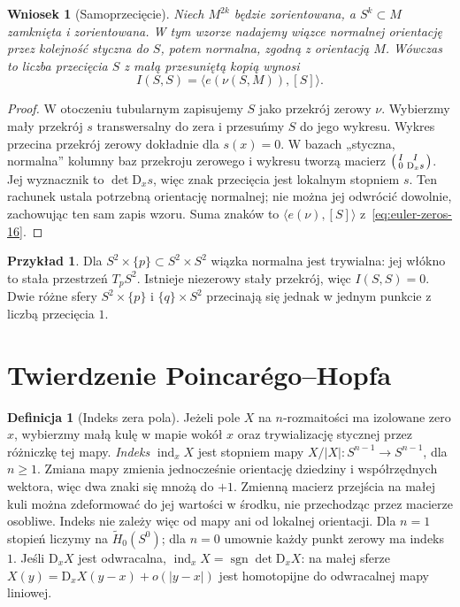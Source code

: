 \documentclass[11pt,a4paper,oneside]{report}
\newcommand{\D}{\mathrm D}
\theoremstyle{plain}
\newtheorem{wniosek}[twierdzenie]{Wniosek}
\theoremstyle{definition}
\newtheorem{definicja}[twierdzenie]{Definicja}
\newtheorem{przyklad}[twierdzenie]{Przykład}
\theoremstyle{remark}
\begin{document}
\begin{wniosek}[Samoprzecięcie]
\label{cor:samoprzeciecie-16}
Niech $M^{2k}$ będzie zorientowana, a
$S^k\subset M$ zamknięta i zorientowana.
W tym wzorze nadajemy wiązce normalnej orientację
przez kolejność \emph{styczna do $S$, potem normalna},
zgodną z orientacją $M$. Wówczas
to liczba przecięcia
$S$ z małą przesuniętą
kopią wynosi
\[
 I(S,S)=\langle e(\nu(S,M)),[S]\rangle.
\]
\end{wniosek}
\begin{proof}
W otoczeniu tubularnym
zapisujemy $S$ jako
przekrój zerowy $\nu$.
Wybierzmy mały przekrój
$s$ transwersalny do
zera i przesuńmy $S$
do jego wykresu.
Wykres przecina
przekrój zerowy
dokładnie dla $s(x)=0$.
W bazach „styczna, normalna” kolumny baz
przekroju zerowego i wykresu tworzą macierz
$\begin{psmallmatrix}I&I\\0&\D_xs\end{psmallmatrix}$.
Jej wyznacznik to $\det\D_xs$, więc znak przecięcia
jest lokalnym stopniem $s$. Ten rachunek ustala
potrzebną orientację normalnej; nie można jej
odwrócić dowolnie, zachowując ten sam zapis wzoru.
Suma znaków to
$\langle e(\nu),[S]\rangle$
z~\eqref{eq:euler-zeros-16}.
\end{proof}

\begin{przyklad}
Dla $S^2\times\{p\}
\subset S^2\times S^2$
wiązka normalna jest
trywialna: jej włókno
to stała przestrzeń
$T_pS^2$. Istnieje
niezerowy stały
przekrój, więc
$I(S,S)=0$.
Dwie różne sfery
$S^2\times\{p\}$
i $\{q\}\times S^2$
przecinają się
jednak w jednym
punkcie z liczbą
przecięcia $1$.
\end{przyklad}

\section{Twierdzenie Poincarégo--Hopfa}
\label{sec:poincare-hopf-16}

\begin{definicja}[Indeks zera pola]
Jeżeli pole $X$ na
$n$-rozmaitości ma
izolowane zero $x$,
wybierzmy małą kulę w mapie wokół $x$
oraz trywializację stycznej przez różniczkę tej mapy.
\emph{Indeks} $\operatorname{ind}_x X$
jest stopniem mapy
$X/|X|:S^{n-1}\to S^{n-1}$, dla $n\geq1$.
Zmiana mapy zmienia jednocześnie orientację dziedziny
i współrzędnych wektora, więc dwa znaki się mnożą
do $+1$. Zmienną macierz przejścia na małej kuli
można zdeformować do jej wartości w środku, nie
przechodząc przez macierze osobliwe. Indeks nie
zależy więc od mapy ani od lokalnej orientacji.
Dla $n=1$ stopień liczymy na $\widetilde H_0(S^0)$;
dla $n=0$ umownie każdy punkt zerowy ma indeks $1$.
Jeśli $\D_xX$ jest
odwracalna,
$\operatorname{ind}_xX
=\operatorname{sgn}\det\D_xX$:
na małej sferze
$X(y)=\D_xX(y-x)+o(|y-x|)$
jest homotopijne
do odwracalnej
mapy liniowej.
\end{definicja}
\end{document}
